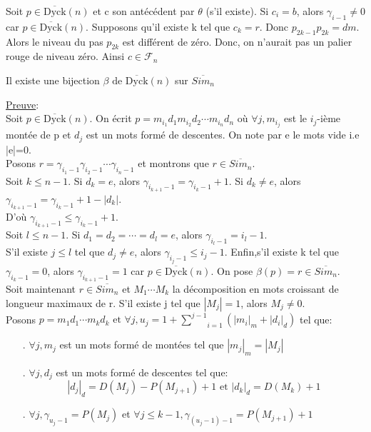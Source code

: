 			Soit $p\in \overline{\text{Dyck}}(n) $ et c son antécédent par $\theta$	(s'il existe). Si $c_{i}=b$, alors $\gamma_{i-1}\neq 0$ car $p\in \overline{\text{Dyck}}(n) $. Supposons qu'il existe k tel que $c_{k}=r$. Donc $p_{2k-1}p_{2k}=dm$. Alors le niveau du pas $p_{2k}$ est différent de zéro. Donc, on n'aurait pas un palier rouge de niveau zéro. Ainsi $c\in \mathcal{F}_{n}$
			
		\begin{proposition}
			Il existe une bijection $ \beta \text{ de 	} \overline{\text{Dyck}}(n) $ sur $ \overline{Sim_{n}} $
		\end{proposition}
			\underline{Preuve}:\\
			Soit $ p \in \overline{\text{Dyck}}(n) $. On écrit $ p = m_{i_{1}}d_{1}m_{i_{2}}d_{2} \cdots m_{i_{n}}d_{n} $ où $ \forall j, m_{i_{j}} $ est le $i_{j}$-ième montée de p et $ d_{j} $ est un mots formé de descentes. On note par e le mots vide i.e |e|=0.\\
			Posons $ r = \gamma_{i_{1}-1} \gamma_{i_{2}-1} \cdots \gamma_{i_{n}-1}$ et montrons que $ r \in \overline{Sim_{n}} $.\\ 
			Soit $ k \leq n-1 $. Si $ d_{k} = e $, alors $ \gamma_{i_{k+1}-1} = \gamma_{i_{k}-1} + 1 $. Si $ d_{k} \neq e $, alors $ \gamma_{i_{k+1}-1} = \gamma_{i_{k}-1} + 1 - |d_{k}| $.\\
			D'où $ \gamma_{i_{k+1}-1} \leq \gamma_{i_{k}-1} + 1 $.\\
			Soit $ l \leq n-1 $. Si $ d_{1}=d_{2}=\cdots= d_{l}=e $, alors $ \gamma_{i_{l}-1}=i_{l}-1 $.\\
			S'il existe $ j \leq l$ tel que $ d_{j} \neq e $, alors  $ \gamma_{i_{j}-1} \leq i_{j}-1 $. Enfin,s'il existe k tel que  $ \gamma_{i_{k}-1} = 0 $, alors   $ \gamma_{i_{k+1}-1}= 1 $ car $ p \in \overline{\text{Dyck}}(n) $. On pose $ \beta(p) = r \in \overline{Sim_{n}}$.\\
			Soit maintenant $r \in \overline{Sim_{n}}$ et $ M_{1}\cdots M_{k} $ la décomposition en mots croissant de longueur maximaux de r. S'il existe j tel que $ |M_{j}|=1$, alors $M_{j}\neq 0$.\\
			Posons $ p=m_{1}d_{1}\cdots m_{k}d_{k} \text{ et } \forall j, u_{j} = 1+\underset{i=1}{\overset{j-1}{\sum}}(|m_{i}|_{m}+|d_{i}|_{d}) $ tel que: 
			\begin{itemize}
				\item[.] $ \forall j, m_{j} $ est un mots formé de montées tel que $|m_{j}|_{m}=|M_{j}|$
				\item[.] $ \forall j, d_{j} $ est un mots formé de descentes tel que: \[ |d_{j}|_{d}= D(M_{j})-P(M_{j+1})+1 \text{ et } |d_{k}|_{d}= D(M_{k})+1 \]
				\item[.] $ \forall j, \gamma_{u_{j}-1}=P(M_{j}) $ et $ \forall j\leq k-1, \gamma_{(u_{j}-1)-1} = P(M_{j+1})+1 $
			\end{itemize}
